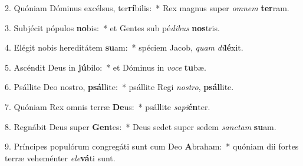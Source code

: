 2. Quóniam Dóminus excélsus, ter\textbf{rí}bilis:~*  Rex magnus super \textit{om}\textit{nem} \textbf{ter}ram.\

3. Subjécit pópulos \textbf{no}bis:~*  et Gentes sub pé\textit{di}\textit{bus} \textbf{nos}tris.\

4. Elégit nobis hereditátem \textbf{su}am:~*  spéciem Jacob, \textit{quam} \textit{di}\textbf{lé}xit.\

5. Ascéndit Deus in \textbf{jú}bilo:~*  et Dóminus in \textit{vo}\textit{ce} \textbf{tu}bæ.\

6. Psállite Deo nostro, \textbf{psál}lite:~*  psállite Regi \textit{nos}\textit{tro}, \textbf{psál}lite.\

7. Quóniam Rex omnis terræ \textbf{De}us:~*  psállite \textit{sa}\textit{pi}\textbf{én}ter.\

8. Regnábit Deus super \textbf{Gen}tes:~*  Deus sedet super sedem \textit{sanc}\textit{tam} \textbf{su}am.\

9. Príncipes populórum congregáti sunt cum Deo \textbf{A}braham:~*  quóniam dii fortes terræ veheménter \textit{e}\textit{le}\textbf{vá}ti sunt.\

